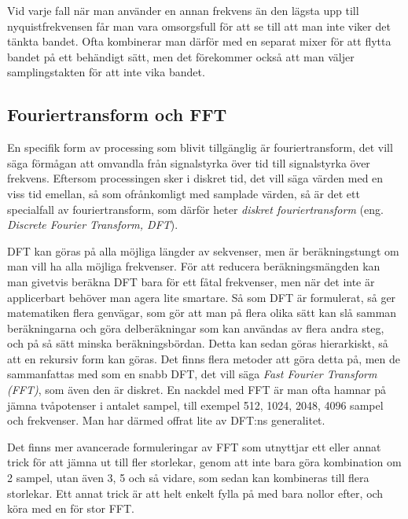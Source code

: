 Vid varje fall när man använder en annan frekvens än den lägsta upp till
nyquistfrekvensen får man vara omsorgsfull för att se till att man inte viker
det tänkta bandet.
Ofta kombinerar man därför med en separat mixer för att flytta bandet på ett
behändigt sätt, men det förekommer också att man väljer samplingstakten för att
inte vika bandet.

\subsection{Fouriertransform och FFT}

En specifik form av processing som blivit tillgänglig är fouriertransform,
det vill säga förmågan att omvandla från signalstyrka över tid till
signalstyrka över frekvens.
Eftersom processingen sker i diskret tid, det vill säga värden med en viss tid
emellan, så som ofrånkomligt med samplade värden, så är det ett specialfall av
fouriertransform, som därför heter \emph{diskret fouriertransform} (eng.
\emph{Discrete Fourier Transform, DFT}).

DFT kan göras på alla möjliga längder av sekvenser, men är beräkningstungt
om man vill ha alla möjliga frekvenser.
För att reducera beräkningsmängden kan man givetvis beräkna DFT bara för ett
fåtal frekvenser, men när det inte är applicerbart behöver man agera lite
smartare.
Så som DFT är formulerat, så ger matematiken flera genvägar, som gör att man
på flera olika sätt kan slå samman beräkningarna och göra delberäkningar som
kan användas av flera andra steg, och på så sätt minska beräkningsbördan.
Detta kan sedan göras hierarkiskt, så att en rekursiv form kan göras.
Det finns flera metoder att göra detta på, men de sammanfattas med som en snabb
DFT, det vill säga \emph{Fast Fourier Transform (FFT)}, som även den är diskret.
En nackdel med FFT är man ofta hamnar på jämna tvåpotenser i antalet sampel,
till exempel 512, 1024, 2048, 4096 sampel och frekvenser.
Man har därmed offrat lite av DFT:ns generalitet.

Det finns mer avancerade formuleringar av FFT som utnyttjar ett eller annat
trick för att jämna ut till fler storlekar, genom att inte bara göra
kombination om 2 sampel, utan även 3, 5 och så vidare, som sedan kan kombineras
till flera storlekar.
Ett annat trick är att helt enkelt fylla på med bara nollor efter, och köra
med en för stor FFT.

